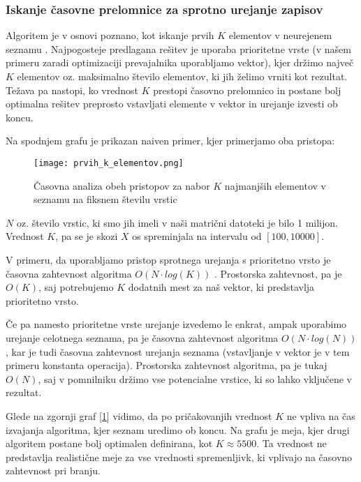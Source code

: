\documentclass[a4paper,12pt,openright]{book}
\begin{document}
        \subsubsection{Iskanje časovne prelomnice za sprotno urejanje zapisov}

        Algoritem je v osnovi poznano, kot iskanje prvih $K$ elementov v neurejenem seznamu \cite{G4G_KSMALLEST}. Najpogosteje predlagana rešitev je uporaba prioritetne vrste (v našem primeru zaradi optimizaciji prevajalnika uporabljamo vektor), kjer držimo največ $K$ elementov oz. maksimalno število elementov, ki jih želimo vrniti kot rezultat. Težava pa nastopi, ko vrednost $K$ prestopi časovno prelomnico in postane bolj optimalna rešitev preprosto vstavljati elemente v vektor in urejanje izvesti ob koncu.

        Na spodnjem grafu je prikazan naiven primer, kjer primerjamo oba pristopa:
        \begin{figure}[H]
            \centerline{\texttt{[image: prvih\_k\_elementov.png]}}
            \caption{Časovna analiza obeh pristopov za nabor $K$ najmanjših elementov v seznamu na fiksnem številu vrstic}
            \label{sl:prvih_k_elementov}
        \end{figure}

        \noindent
        $N$ oz. število vrstic, ki smo jih imeli v naši matrični datoteki je bilo 1 milijon. Vrednost $K$, pa se je skozi $X$ os spreminjala na intervalu od $[100, 10000]$.

        V primeru, da uporabljamo pristop sprotnega urejanja s prioritetno vrsto je časovna zahtevnost algoritma $O(N \cdot log(K))$ . Prostorska zahtevnost, pa je $O(K)$, saj potrebujemo $K$ dodatnih mest za naš vektor, ki predstavlja prioritetno vrsto.

        Če pa namesto prioritetne vrste urejanje izvedemo le enkrat, ampak uporabimo urejanje celotnega seznama, pa je časovna zahtevnost algoritma $O(N \cdot log(N))$, kar je tudi časovna zahtevnost urejanja seznama (vstavljanje v vektor je v tem primeru konstanta operacija). Prostorska zahtevnost algoritma, pa je tukaj $O(N)$, saj v pomnilniku držimo vse potencialne vrstice, ki so lahko vključene v rezultat.

        Glede na zgornji graf [\ref{sl:prvih_k_elementov}] vidimo, da po pričakovanjih vrednost $K$ ne vpliva na čas izvajanja algoritma, kjer seznam uredimo ob koncu. Na grafu je meja, kjer drugi algoritem postane bolj optimalen definirana, kot $K \approx 5500$. Ta vrednost ne predstavlja realistične meje za vse vrednosti spremenljivk, ki vplivajo na časovno zahtevnost pri branju.
\end{document}
